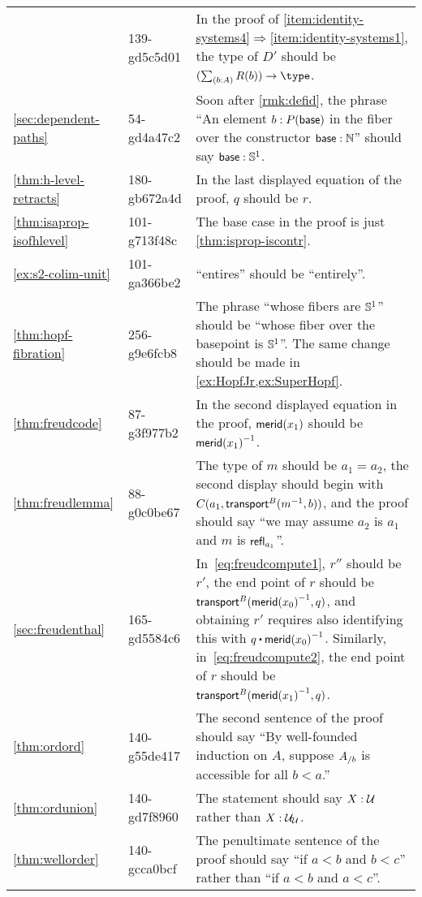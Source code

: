 \documentclass[
%
%
11pt %
]{article}
\begin{document}
\begin{longtable}{llp{10.5cm}}
  & 139-gd5c5d01
  & In the proof of \ref{item:identity-systems4}$\Rightarrow$\ref{item:identity-systems1}, the type of $D'$ should be $(\sm{b:A} R(b)) \to \type$.\\
  \autoref{sec:dependent-paths}
  & 54-gd4a47c2
  & Soon after \autoref{rmk:defid}, the phrase ``An element $b:P(\mathsf{base})$ in the fiber over the constructor $\mathsf{base}:\mathbb{N}$'' should say $\mathsf{base}:\mathbb{S}^1$.\\
  \autoref{thm:h-level-retracts}
  & 180-gb672a4d
  & In the last displayed equation of the proof, $q$ should be $r$.\\
  \autoref{thm:isaprop-isofhlevel}
  & 101-g713f48c
  & The base case in the proof is just \autoref{thm:isprop-iscontr}.\\
  \autoref{ex:s2-colim-unit}
  & 101-ga366be2
  & ``entires'' should be ``entirely''.\\
  \autoref{thm:hopf-fibration}
  & 256-g9e6fcb8
  & The phrase ``whose fibers are $\mathbb{S}^1$'' should be ``whose fiber over the basepoint is $\mathbb{S} ^1$''.
  The same change should be made in \autoref{ex:HopfJr,ex:SuperHopf}.\\
  \autoref{thm:freudcode}
  & 87-g3f977b2
  & In the second displayed equation in the proof, $\mathsf{merid}(x_1)$ should be $\mathord{{\mathsf{merid}(x_1)}^{-1}}$.\\
  \autoref{thm:freudlemma}
  & 88-g0c0be67
  & The type of $m$ should be $a_1=a_2$, the second display should begin with $C(a_1,\mathsf{transport}^{B}(\mathord{{m}^{-1}},b))$, and the proof should say ``we may assume $a_2$ is $a_1$ and $m$ is $\mathsf{refl}_{a_1}$''.\\
  \autoref{sec:freudenthal}
  & 165-gd5584c6
  & In~\eqref{eq:freudcompute1}, $r''$ should be $r'$, the end point of $r$ should be $\mathsf{transport}^{B}(\mathord{{\mathsf{merid}(x_0)}^{-1}},q)$, and obtaining $r'$ requires also identifying this with $q \ct \opp{\merid(x_0)}$.
  Similarly, in~\eqref{eq:freudcompute2}, the end point of $r$ should be $\mathsf{transport}^{B}(\mathord{{\mathsf{merid}(x_1)}^{-1}},q)$.\\
  \autoref{thm:ordord}
  & 140-g55de417
  & The second sentence of the proof should say ``By well-founded induction on $A$, suppose ${A}_{/b}$ is accessible for all $b<a$.''\\
  \autoref{thm:ordunion}
  & 140-gd7f8960
  & The statement should say $X:\mathcal{U}$ rather than $X:\mathcal{U}_\mathcal{U}$.\\
  \autoref{thm:wellorder}
  & 140-gcca0bcf
  & The penultimate sentence of the proof should say ``if $a<b$ and $b<c$'' rather than ``if $a<b$ and $a<c$''.\\

\end{longtable}
\end{document}
